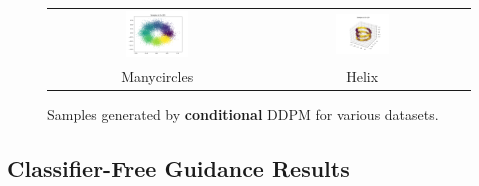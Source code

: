 \documentclass[11pt]{article}
\begin{document}
\begin{figure}[H]
\begin{tabular}{ccc}
        
        \includegraphics[width=0.3\textwidth]{exps/ddpm_2_150_0.0001_0.02_manycircles/samples_conditional_150.png} &
        \includegraphics[width=0.3\textwidth]{exps/ddpm_3_150_0.0001_0.02_helix/samples_conditional_150.png} & \\
        Manycircles & Helix & \\
    \end{tabular}
    \caption{Samples generated by \textbf{conditional} DDPM for various datasets.}
    \label{fig:cond_all_data}
\end{figure}

\subsection{Classifier-Free Guidance Results}
\end{document}
